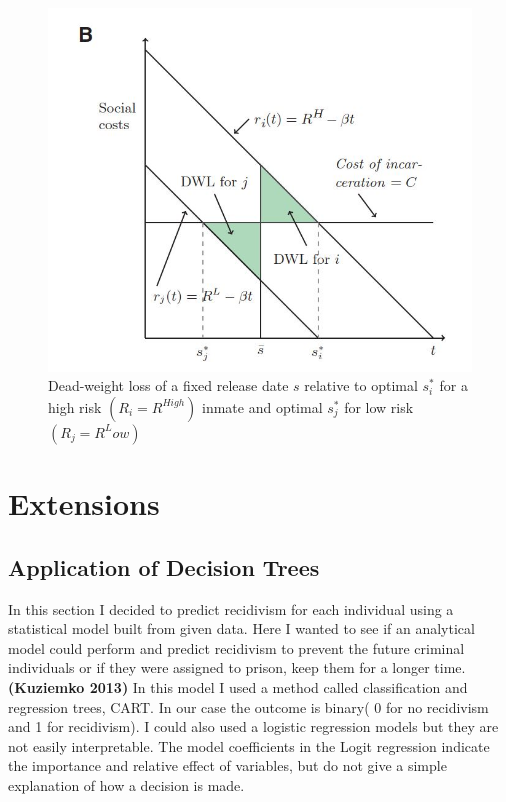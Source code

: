 \documentclass[a4paper,12pt]{article}
\begin{document}
\begin{figure}[h]
\centering
\includegraphics[scale=0.60]{fig2.JPG}
\caption{Dead-weight loss of a fixed release date $s$ relative to optimal $s^*_i$ for a high risk $(R_i = R^{High})$ inmate and optimal $s^*_j$ for low risk $(R_j = R^Low)$}
\label{fig:Figure 2}
\end{figure}

\newpage
\section{Extensions}
\subsection{Application of Decision Trees}
In this section I decided to predict recidivism for each individual using a statistical model built from given data. Here I wanted to see if an analytical model could perform and predict recidivism to prevent the future criminal individuals or if they were assigned to prison, keep them for a longer time. \textbf{(Kuziemko 2013)}\cite{Kuziemko2013} In this model I used a method called classification and regression trees, CART. In our case the outcome is binary( 0 for no recidivism and 1 for recidivism). I could also used a logistic regression models but they are not easily interpretable. The model coefficients in the Logit regression indicate the importance and relative effect of variables, but do not give a simple explanation of how a decision is made. 
\end{document}
